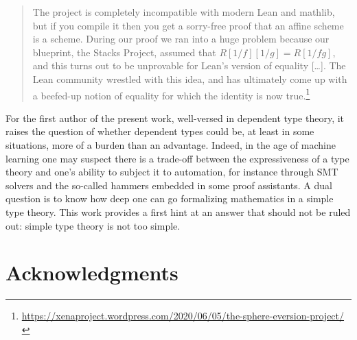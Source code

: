 \documentclass[12pt]{scrartcl}
\begin{document}
\begin{quote}
	The project is completely incompatible with modern Lean and mathlib, but if you compile it then you get a sorry-free proof that an affine scheme is a scheme. During our proof we ran into a huge problem because our blueprint, the Stacks Project, assumed that $R[1/f][1/g]=R[1/fg]$, and this turns out to be unprovable for Lean’s version of equality [\dots]. The Lean community wrestled with this idea, and has ultimately come up with a beefed-up notion of equality for which the identity is now true.\footnote{\url{https://xenaproject.wordpress.com/2020/06/05/the-sphere-eversion-project/}}
\end{quote}	
For the first author of the present work, well-versed in dependent type theory, it raises the question of whether dependent types could be, at least in some situations, more of a burden than an advantage. Indeed, in the age of machine learning one may suspect there is a trade-off between the expressiveness of a type theory and one's ability to subject it to automation, for instance through SMT solvers and the so-called hammers embedded in some proof assistants. A dual question is to know how deep one can go formalizing mathematics in a simple type theory. This work provides a first hint at an answer that should not be ruled out: simple type theory is not too simple.       

\section*{Acknowledgments}  			
\end{document}
